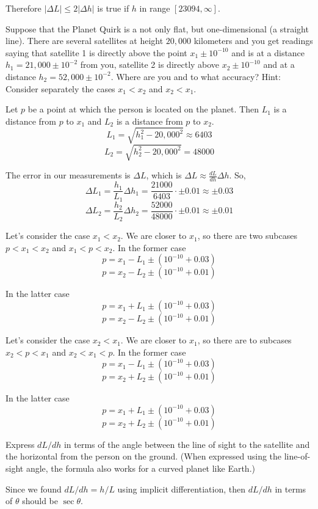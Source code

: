 \documentclass{article}
\begin{document}
\par Therefore $|\Delta L| \leq 2|\Delta h|$ is true if $h$ in range $\left[ 23094, \infty \right]$.

\begin{tcolorbox}
    Suppose that the Planet Quirk is a not only flat, but one-dimensional (a straight line). There are several
    satellites at height $20,000$ kilometers and you get readings saying that satellite 1 is directly above the
    point $x_1 \pm 10^{-10}$ and is at a distance $h_1 = 21,000 \pm 10^{-2}$ from you, satellite 2 is directly
    above $x_2 \pm 10^{-10}$ and at a distance $h_2 = 52,000 \pm 10^{-2}$. Where are you and to what accuracy?
    Hint: Consider separately the cases $x_1 < x_2$ and $x_2 < x_1$.
\end{tcolorbox}
Let $p$ be a point at which the person is located on the planet. Then $L_1$ is a distance from $p$ to $x_1$ and $L_2$ is a distance from $p$ to $x_2$.
\[ L_1 = \sqrt{h_1^2 - 20,000^2} \approx 6403 \]
\[ L_2 = \sqrt{h_2^2 - 20,000^2} = 48000 \]

\par The error in our measurements is $\Delta L$, which is $\Delta L \approx \frac{dL}{dh} \Delta h$. So,
\[ \Delta L_1 = \frac{h_1}{L_1} \Delta h_1 = \frac{21000}{6403} \cdot \pm 0.01 \approx \pm 0.03 \]
\[ \Delta L_2 = \frac{h_2}{L_2} \Delta h_2 = \frac{52000}{48000} \cdot \pm 0.01  \approx \pm 0.01 \]

Let's consider the case $x_1 < x_2$. We are closer to $x_1$, so there are two subcases $p < x_1 < x_2$ and $x_1 < p < x_2$.
In the former case
\[p = x_1 - L_1 \pm (10^{-10} + 0.03) \]
\[ p = x_2 - L_2 \pm (10^{-10} + 0.01) \]
\par In the latter case
\[ p = x_1 + L_1 \pm (10^{-10} + 0.03) \]
\[ p = x_2 - L_2 \pm (10^{-10} + 0.01) \]

\par Let's consider the case $x_2 < x_1$. We are closer to $x_1$, so there are to subcases $x_2 < p < x_1$ and $x_2 < x_1 < p$. In the former case
\[p = x_1 - L_1 \pm (10^{-10} + 0.03) \]
\[p = x_2 + L_2 \pm (10^{-10} + 0.01) \]
\par In the latter case
\[ p = x_1 + L_1 \pm (10^{-10} + 0.03)\]
\[ p = x_2 + L_2 \pm (10^{-10} + 0.01) \]

\newpage
\begin{tcolorbox}
    Express $dL/dh$ in terms of the angle between the line of sight to the satellite and the horizontal from the person on the ground. (When expressed using the line-of-sight angle, the formula also works for a curved planet like Earth.)
\end{tcolorbox}
\begin{figure}[htp!]
    \centering
    
    \label{fig:fig10}
\end{figure}
Since we found $dL/dh = h/L$ using implicit differentiation, then $dL/dh$ in terms of $\theta$ should be $\sec{\theta}$.
\end{document}
